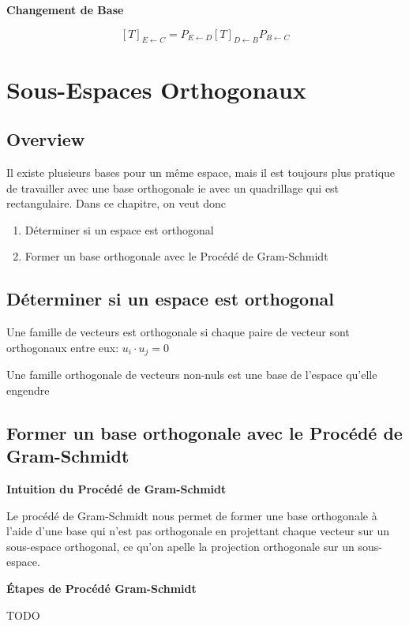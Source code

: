 \documentclass{article}
\begin{document}
\textbf{Changement de Base}

\begin{theorem}
    $$ [T]_{E \leftarrow C} = P_{E \leftarrow D} [T]_{D \leftarrow B}
    P_{B \leftarrow C} $$
\end{theorem}

\section{Sous-Espaces Orthogonaux}%
\label{sec:Sous-Espaces Orthogonaux}

\subsection{Overview}%
\label{sub:Overview}

Il existe plusieurs bases pour un même espace, mais il est toujours plus
pratique de travailler avec une base orthogonale ie avec un quadrillage qui
est rectangulaire. Dans ce chapitre, on veut donc
\begin{enumerate}
    \item Déterminer si un espace est orthogonal
    \item Former un base orthogonale avec le Procédé de Gram-Schmidt
\end{enumerate}

\subsection{Déterminer si un espace est orthogonal}

\begin{theorem}
    Une famille de vecteurs est orthogonale si chaque paire de vecteur
    sont orthogonaux entre eux: $ u_i \cdot u_j = 0 $
\end{theorem}

\begin{theorem}
    Une famille orthogonale de vecteurs non-nuls est une base de l'espace
    qu'elle engendre
\end{theorem}

\begin{theorem}
\end{theorem}

\begin{problem}
\end{problem}

\subsection{Former un base orthogonale avec le Procédé de Gram-Schmidt}

\textbf{Intuition du Procédé de Gram-Schmidt}

Le procédé de Gram-Schmidt nous permet de former une base orthogonale
à l'aide d'une base qui n'est pas orthogonale en projettant chaque
vecteur sur un sous-espace orthogonal, ce qu'on apelle la projection
orthogonale sur un sous-espace.

\textbf{Étapes de Procédé Gram-Schmidt}

TODO
\end{document}
